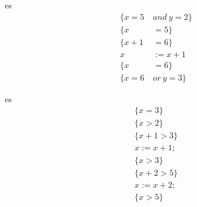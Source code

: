 \documentclass{article}
\begin{document}
\begin{esempio}{es}
    \begin{align*}
        \{x=5\ &and\ y=2\} \\
        \{x&=5\} \\
        \{x+1&=6\} \\
        x&:=x+1 \\
        \{x&=6\} \\
        \{x=6\ &or\ y=3\}
    \end{align*}
\end{esempio}

\begin{esempio}{es}
    \[\begin{array}{c}
        \{x=3\} \\
        \{x>2\} \\
        \{x+1>3\} \\
        x:=x+1; \\
        \{x>3\} \\
        \{x+2>5\} \\
        x:=x+2; \\
        \{x>5\}
    \end{array}\] 
\end{esempio}
\end{document}
